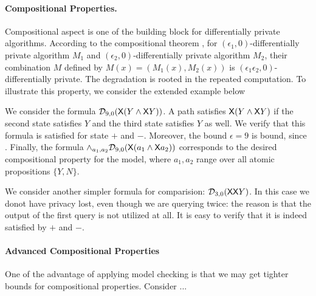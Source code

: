 \paragraph{Compositional Properties.}
Compositional aspect is one of the building block for differentially private algorithms. According to the compositional theorem \cite{}, for $(\epsilon_1,0)$-differentially private algorithm $M_1$ and
$(\epsilon_2,0)$-differentially private algorithm $M_2$, their combination $M$ defined by $M(x)=(M_1(x), M_2(x))$ is $(\epsilon_1\epsilon_2,0)$-differentially private. The degradation is rooted in the repeated computation. To illustrate this property, we consider the extended example below 

We consider the formula $\mathcal{D}_{{9}, {0}} (\mathsf{X} (Y\wedge \mathsf{X} Y))$. A path satisfies $\mathsf{X} (Y\wedge \mathsf{X} Y)$ if the second state satisfies $Y$ and the third state satisfies $Y$ as well. We verify that this formula is satisfied  for state $+$ and $-$. Moreover, the bound $\epsilon=9$ is bound, since . Finally, the formula $\wedge_{a_1,a_2}\mathcal{D}_{{9}, {0}} (\mathsf{X} (a_1\wedge \mathsf{X} a_2))$ corresponds to the desired compositional property for the model, where $a_1,a_2$ range over all atomic propositions $\{Y,N\}$.

We consider another simpler formula for comparision: $\mathcal{D}_{{3}, {0}} (\mathsf{X} \mathsf{X} Y)$. In this case we donot have privacy lost, even though we are querying twice: the reason is that the output of the first query is not utilized at all. It is easy to verify that it is indeed satisfied by $+$ and $-$.

\paragraph{Advanced Compositional Properties}

One of the advantage of applying model checking is that we may get tighter bounds for compositional properties. Consider ...



